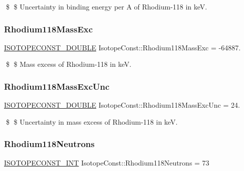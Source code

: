 \$ \$ Uncertainty in binding energy per A of Rhodium-\/118 in keV. \mbox{\label{group___isotope_const-_rhodium-_rh118_gae13e06ec27b698b687de865f71b60da0}} 
\subsubsection{\texorpdfstring{Rhodium118\+Mass\+Exc}{Rhodium118MassExc}}
{\footnotesize\ttfamily \mbox{\hyperlink{group___isotope_const-_macros_ga8f45a7272ce02c0b4c65c44636ed719a}{I\+S\+O\+T\+O\+P\+E\+C\+O\+N\+S\+T\+\_\+\+D\+O\+U\+B\+LE}} Isotope\+Const\+::\+Rhodium118\+Mass\+Exc = -\/64887.}

\$ \$ Mass excess of Rhodium-\/118 in keV. \mbox{\label{group___isotope_const-_rhodium-_rh118_ga82ac05f3f306dcab53e19667af0b3df8}} 
\subsubsection{\texorpdfstring{Rhodium118\+Mass\+Exc\+Unc}{Rhodium118MassExcUnc}}
{\footnotesize\ttfamily \mbox{\hyperlink{group___isotope_const-_macros_ga8f45a7272ce02c0b4c65c44636ed719a}{I\+S\+O\+T\+O\+P\+E\+C\+O\+N\+S\+T\+\_\+\+D\+O\+U\+B\+LE}} Isotope\+Const\+::\+Rhodium118\+Mass\+Exc\+Unc = 24.}

\$ \$ Uncertainty in mass excess of Rhodium-\/118 in keV. \mbox{\label{group___isotope_const-_rhodium-_rh118_ga0817d824188f36ecde53700ecb2e71bb}} 
\subsubsection{\texorpdfstring{Rhodium118\+Neutrons}{Rhodium118Neutrons}}
{\footnotesize\ttfamily \mbox{\hyperlink{group___isotope_const-_macros_ga5f18360b3e99483a35c32d789e62621c}{I\+S\+O\+T\+O\+P\+E\+C\+O\+N\+S\+T\+\_\+\+I\+NT}} Isotope\+Const\+::\+Rhodium118\+Neutrons = 73}

